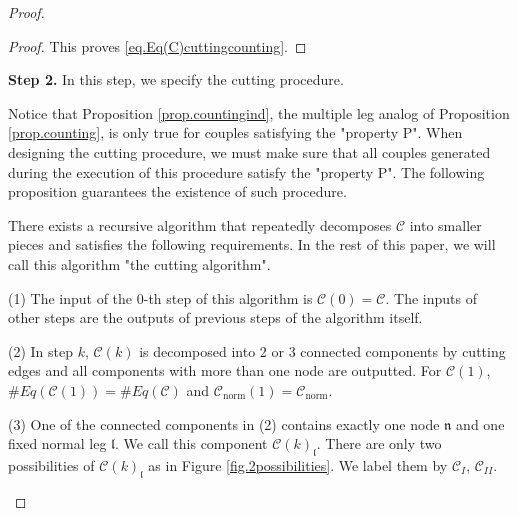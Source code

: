 \begin{proof}
\begin{proof}
This proves \eqref{eq.Eq(C)cuttingcounting}.
\end{proof}









\textbf{Step 2.} In this step, we specify the cutting procedure. 

Notice that Proposition \ref{prop.countingind}, the multiple leg analog of Proposition \ref{prop.counting}, is only true for couples satisfying the "property P". When designing the cutting procedure, we must make sure that all couples generated during the execution of this procedure satisfy the "property P". The following proposition guarantees the existence of such procedure.

\begin{prop}\label{prop.cuttingalgorithm}
There exists a recursive algorithm that repeatedly decomposes $\mathcal{C}$ into smaller pieces and satisfies the following requirements. In the rest of this paper, we will call this algorithm "the cutting algorithm".

(1) The input of the $0$-th step of this algorithm is $\mathcal{C}(0)=\mathcal{C}$. The inputs of other steps are the outputs of previous steps of the algorithm itself.

(2) In step $k$, $\mathcal{C}(k)$ is decomposed into 2 or 3 connected components by cutting edges and all components with more than one node are outputted. For $\mathcal{C}(1)$, $\# Eq(\mathcal{C}(1))=\# Eq(\mathcal{C})$ and $\mathcal{C}_{\text{norm}}(1)=\mathcal{C}_{\text{norm}}$.

(3) One of the connected components in (2) contains exactly one node $\mathfrak{n}$ and one fixed normal leg $\mathfrak{l}$. We call this component $\mathcal{C}(k)_{
\mathfrak{l}}$. There are only two possibilities of $\mathcal{C}(k)_{\mathfrak{l}}$ as in Figure \ref{fig.2possibilities}. We label them by $\mathcal{C}_{I}$, $\mathcal{C}_{II}$.

\begin{figure}[H]
    \centering
\end{figure}
\end{prop}
\end{proof}
